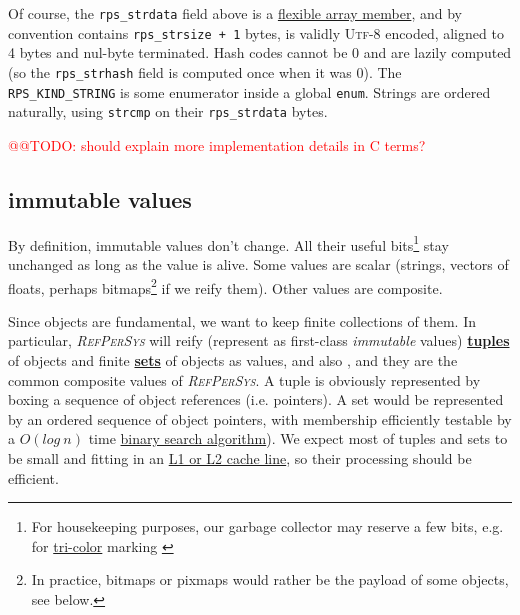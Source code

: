\documentclass[11pt,a4paper,svgnames]{article}
\newcommand{\RefPerSys}{{\textit{\textsc{RefPerSys}}}}
\begin{document}
Of course, the \texttt{rps\_strdata} field above is a
\href{https://en.wikipedia.org/wiki/Flexible_array_member}{flexible
  array member}, and by convention contains \texttt{rps\_strsize + 1}
bytes, is validly \textsc{Utf-8} encoded, aligned to 4 bytes and
nul-byte terminated. Hash codes cannot be 0 and are lazily computed
(so the \texttt{rps\_strhash} field is computed once when it was
0). The \texttt{RPS\_KIND\_STRING} is some enumerator inside a global
\texttt{enum}. Strings are ordered naturally, using \texttt{strcmp} on
their \texttt{rps\_strdata} bytes.


\smallskip



\textcolor{red}{@@TODO: should explain more implementation details in C terms?}


\medskip
  
\subsection{immutable values}
\label{subsec:immutable-values}

By definition, immutable values don't change. All their useful
bits\footnote{For housekeeping purposes, our garbage collector may
reserve a few bits, e.g. for
\href{https://www.memorymanagement.org/glossary/t.html}{tri-color}
marking \cite{wilson:1992:uniprocessorgc}} stay unchanged as long as
the value is alive. Some values are scalar (strings, vectors of
floats, perhaps bitmaps\footnote{In practice, bitmaps or pixmaps would
rather be the payload of some objects, see below.} if we reify
them). Other values are composite.

Since objects are fundamental, we want to keep finite collections of
them. In particular, {\RefPerSys} will reify (represent as first-class
\emph{immutable} values)
\href{https://en.wikipedia.org/wiki/Tuple}{\textbf{tuples}}
 of objects and finite
\href{https://en.wikipedia.org/wiki/Set_(abstract_data_type)}{\textbf{sets}}
of objects as values, and also , and they are the common composite
values of \RefPerSys. A tuple is obviously represented by boxing a
sequence of object references (i.e. pointers). A set would be
represented by an ordered sequence of object pointers, with membership
efficiently testable by a
\href{https://en.wikipedia.org/wiki/Time\_complexity}{$O(log~ n)$}
time
\href{https://en.wikipedia.org/wiki/Binary_search_algorithm}{binary
  search algorithm}). We expect most of tuples and sets to be small
and fitting in an
\href{https://en.wikipedia.org/wiki/Cache\_hierarchy}{L1 or L2 cache
  line}, so their processing should be efficient.
\end{document}
